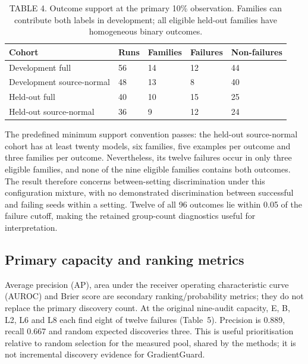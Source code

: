 \begin{table}[t]
\caption{TABLE 4. Outcome support at the primary 10\% observation. Families can contribute both labels in development; all eligible held-out families have homogeneous binary outcomes.}
\label{tab:support}
\centering\small
\setlength{\tabcolsep}{3pt}
\begin{tabular}{lllll}
\toprule Cohort & Runs & Families & Failures & Non-failures\\\midrule
Development full &56&14&12&44\\
Development source-normal &48&13&8&40\\
Held-out full &40&10&15&25\\
Held-out source-normal &36&9&12&24\\\bottomrule
\end{tabular}
\end{table}

The predefined minimum support convention passes: the held-out source-normal cohort has at least twenty models, six families, five examples per outcome and three families per outcome. Nevertheless, its twelve failures occur in only three eligible families, and none of the nine eligible families contains both outcomes. The result therefore concerns between-setting discrimination under this configuration mixture, with no demonstrated discrimination between successful and failing seeds within a setting. Twelve of all 96 outcomes lie within 0.05 of the failure cutoff, making the retained group-count diagnostics useful for interpretation.

\subsection{Primary capacity and ranking metrics}
Average precision (AP), area under the receiver operating characteristic curve (AUROC) and Brier score are secondary ranking/probability metrics; they do not replace the primary discovery count. At the original nine-audit capacity, E, B, L2, L6 and L8 each find eight of twelve failures (Table~5). Precision is 0.889, recall 0.667 and random expected discoveries three. This is useful prioritisation relative to random selection for the measured pool, shared by the methods; it is not incremental discovery evidence for GradientGuard.

